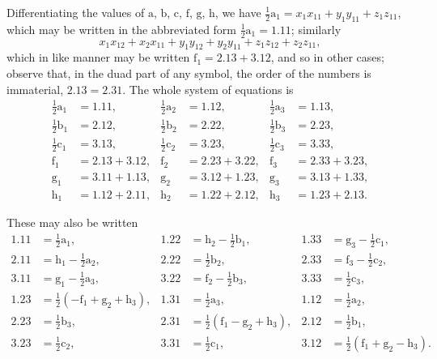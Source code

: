 \documentclass[11pt,a4paper]{article}
\begin{document}
Differentiating the values of $\text{a}$, $\text{b}$, $\text{c}$, $\text{f}$, $\text{g}$, $\text{h}$, we have $\tfrac{1}{2}\text{a}_{1} = x_{1}x_{11} + y_{1}y_{11} + z_{1}z_{11}$, which may be written in the abbreviated form $\tfrac{1}{2}\text{a}_{1} = 1.11$; similarly
\[
x_{1}x_{12} + x_{2}x_{11} + y_{1}y_{12} + y_{2}y_{11} + z_{1}z_{12} + z_{2}z_{11},
\]
which in like manner may be written $\text{f}_{1} = 2.13 + 3.12$, and so in other cases; observe that, in the duad part of any symbol, the order of the numbers is immaterial, $2.13 = 2.31$. The whole system of equations is
\begin{align*}
\tfrac{1}{2}\text{a}_{1} &= 1.11, & \tfrac{1}{2}\text{a}_{2} &= 1.12, & \tfrac{1}{2}\text{a}_{3} &= 1.13,\\
\tfrac{1}{2}\text{b}_{1} &= 2.12, & \tfrac{1}{2}\text{b}_{2} &= 2.22, & \tfrac{1}{2}\text{b}_{3} &= 2.23,\\
\tfrac{1}{2}\text{c}_{1} &= 3.13, & \tfrac{1}{2}\text{c}_{2} &= 3.23, & \tfrac{1}{2}\text{c}_{3} &= 3.33,\\
\text{f}_{1} &= 2.13 + 3.12, & \text{f}_{2} &= 2.23 + 3.22, & \text{f}_{3} &= 2.33 + 3.23,\\
\text{g}_{1} &= 3.11 + 1.13, & \text{g}_{2} &= 3.12 + 1.23, & \text{g}_{3} &= 3.13 + 1.33,\\
\text{h}_{1} &= 1.12 + 2.11, & \text{h}_{2} &= 1.22 + 2.12, & \text{h}_{3} &= 1.23 + 2.13.
\end{align*}

These may also be written
\begin{align*}
1.11 &= \tfrac{1}{2}\text{a}_{1}, & 1.22 &= \text{h}_{2} - \tfrac{1}{2}\text{b}_{1}, & 1.33 &= \text{g}_{3} - \tfrac{1}{2}\text{c}_{1},\\
2.11 &= \text{h}_{1} - \tfrac{1}{2}\text{a}_{2}, & 2.22 &= \tfrac{1}{2}\text{b}_{2}, & 2.33 &= \text{f}_{3} - \tfrac{1}{2}\text{c}_{2},\\
3.11 &= \text{g}_{1} - \tfrac{1}{2}\text{a}_{3}, & 3.22 &= \text{f}_{2} - \tfrac{1}{2}\text{b}_{3}, & 3.33 &= \tfrac{1}{2}\text{c}_{3},\\
1.23 &= \tfrac{1}{2}(-\text{f}_{1} + \text{g}_{2} + \text{h}_{3}), & 1.31 &= \tfrac{1}{2}\text{a}_{3}, & 1.12 &= \tfrac{1}{2}\text{a}_{2},\\
2.23 &= \tfrac{1}{2}\text{b}_{3}, & 2.31 &= \tfrac{1}{2}(\text{f}_{1} - \text{g}_{2} + \text{h}_{3}), & 2.12 &= \tfrac{1}{2}\text{b}_{1},\\
3.23 &= \tfrac{1}{2}\text{c}_{2}, & 3.31 &= \tfrac{1}{2}\text{c}_{1}, & 3.12 &= \tfrac{1}{2}(\text{f}_{1} + \text{g}_{2} - \text{h}_{3}).
\end{align*}
\end{document}
